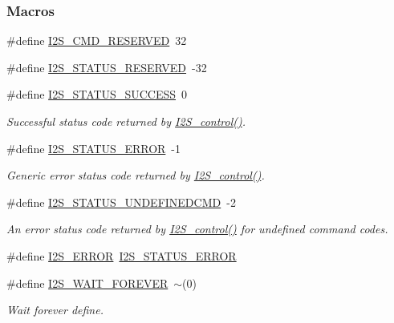 \subsubsection*{Macros}
\begin{DoxyCompactItemize}
\item 
\#define \hyperlink{group___i2_s___c_o_n_t_r_o_l_gaf919ac4341fca59988c28e16058fa819}{I2\+S\+\_\+\+C\+M\+D\+\_\+\+R\+E\+S\+E\+R\+V\+E\+D}~32
\item 
\#define \hyperlink{group___i2_s___c_o_n_t_r_o_l_ga3fad4fcf6773f3c5946c4881631f838d}{I2\+S\+\_\+\+S\+T\+A\+T\+U\+S\+\_\+\+R\+E\+S\+E\+R\+V\+E\+D}~-\/32
\item 
\#define \hyperlink{group___i2_s___s_t_a_t_u_s_ga23118b46858671b6537d3a68721f0282}{I2\+S\+\_\+\+S\+T\+A\+T\+U\+S\+\_\+\+S\+U\+C\+C\+E\+S\+S}~0
\begin{DoxyCompactList}\small\item\em Successful status code returned by \hyperlink{_i2_s_8h_a1af19b22e9036bee696b4e4efe4916b0}{I2\+S\+\_\+control()}. \end{DoxyCompactList}\item 
\#define \hyperlink{group___i2_s___s_t_a_t_u_s_ga775a6dc5aa644d4cca2179afbafb63ad}{I2\+S\+\_\+\+S\+T\+A\+T\+U\+S\+\_\+\+E\+R\+R\+O\+R}~-\/1
\begin{DoxyCompactList}\small\item\em Generic error status code returned by \hyperlink{_i2_s_8h_a1af19b22e9036bee696b4e4efe4916b0}{I2\+S\+\_\+control()}. \end{DoxyCompactList}\item 
\#define \hyperlink{group___i2_s___s_t_a_t_u_s_ga649cf0c869381728fc9b56dfdbbd3e3d}{I2\+S\+\_\+\+S\+T\+A\+T\+U\+S\+\_\+\+U\+N\+D\+E\+F\+I\+N\+E\+D\+C\+M\+D}~-\/2
\begin{DoxyCompactList}\small\item\em An error status code returned by \hyperlink{_i2_s_8h_a1af19b22e9036bee696b4e4efe4916b0}{I2\+S\+\_\+control()} for undefined command codes. \end{DoxyCompactList}\item 
\#define \hyperlink{_i2_s_8h_a81d0dd9da59128b28cb23c59fe57c939}{I2\+S\+\_\+\+E\+R\+R\+O\+R}~\hyperlink{group___i2_s___s_t_a_t_u_s_ga775a6dc5aa644d4cca2179afbafb63ad}{I2\+S\+\_\+\+S\+T\+A\+T\+U\+S\+\_\+\+E\+R\+R\+O\+R}
\item 
\#define \hyperlink{_i2_s_8h_a8fd310c110b6a9425cf61753f3e956ab}{I2\+S\+\_\+\+W\+A\+I\+T\+\_\+\+F\+O\+R\+E\+V\+E\+R}~$\sim$(0)
\begin{DoxyCompactList}\small\item\em Wait forever define. \end{DoxyCompactList}\end{DoxyCompactItemize}
